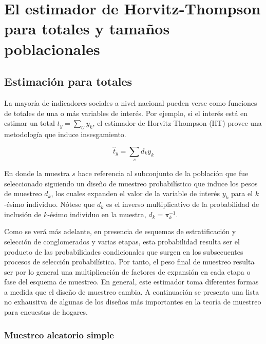 \documentclass[
  12pt,
  spanish,
]{book}
\begin{document}
\hypertarget{el-estimador-de-horvitz-thompson-para-totales-y-tamauxf1os-poblacionales}{%
\section{El estimador de Horvitz-Thompson para totales y tamaños poblacionales}\label{el-estimador-de-horvitz-thompson-para-totales-y-tamauxf1os-poblacionales}}

\hypertarget{estimaciuxf3n-para-totales}{%
\subsection{Estimación para totales}\label{estimaciuxf3n-para-totales}}

La mayoría de indicadores sociales a nivel nacional pueden verse como funciones de totales de una o más variables de interés. Por ejemplo, si el interés está en estimar un total \(t_y=\sum_U y_k\), el estimador de Horvitz-Thompson (HT) provee una metodología que induce insesgamiento.

\[
\hat{t}_y = \sum_s d_k y_k
\]

En donde la muestra \(s\) hace referencia al subconjunto de la población que fue seleccionado siguiendo un diseño de muestreo probabilístico que induce los pesos de muestreo \(d_k\), los cuales expanden el valor de la variable de interés \(y_k\) para el \(k\)-ésimo individuo. Nótese que \(d_k\) es el inverso multiplicativo de la probabilidad de inclusión de \(k\)-ésimo individuo en la muestra, \(d_k = \pi_k^{-1}\).

Como se verá más adelante, en presencia de esquemas de estratificación y selección de conglomerados y varias etapas, esta probabilidad resulta ser el producto de las probabilidades condicionales que surgen en los subsecuentes procesos de selección probabilística. Por tanto, el peso final de muestreo resulta ser por lo general una multiplicación de factores de expansión en cada etapa o fase del esquema de muestreo. En general, este estimador toma diferentes formas a medida que el diseño de muestreo cambia. A continuación se presenta una lista no exhausitva de algunas de los diseños más importantes en la teoría de muestreo para encuestas de hogares.

\hypertarget{muestreo-aleatorio-simple-1}{%
\subsubsection*{Muestreo aleatorio simple}\label{muestreo-aleatorio-simple-1}}
\end{document}

